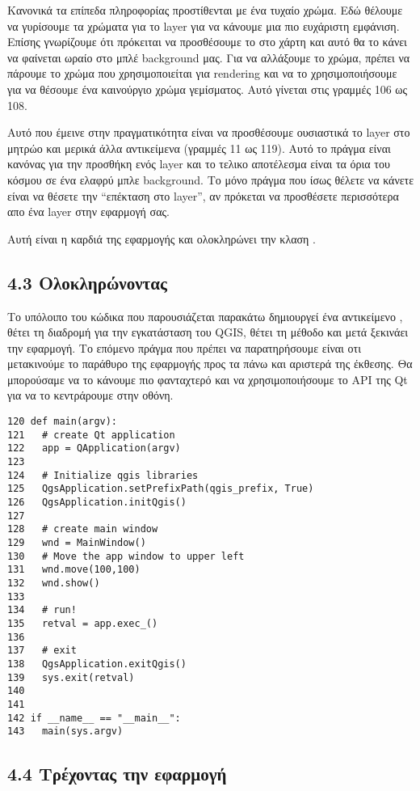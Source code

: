 Κανονικά τα επίπεδα πληροφορίας προστίθενται με ένα τυχαίο χρώμα. Εδώ θέλουμε να γυρίσουμε τα χρώματα για το layer για να κάνουμε μια πιο ευχάριστη εμφάνιση. Επίσης γνωρίζουμε ότι πρόκειται να προσθέσουμε το  στο χάρτη και αυτό θα το κάνει να φαίνεται ωραίο στο μπλέ background μας. Για να αλλάξουμε το χρώμα, πρέπει να πάρουμε το χρώμα που χρησιμοποιείται για rendering και να το χρησιμοποιήσουμε για να θέσουμε ένα καινούργιο χρώμα γεμίσματος. Αυτό γίνεται στις γραμμές  106 ως 108.  

Αυτό που έμεινε στην πραγματικότητα είναι να προσθέσουμε ουσιαστικά το layer στο μητρώο και μερικά άλλα αντικείμενα (γραμμές 11 ως 119). Αυτό το πράγμα είναι κανόνας για την προσθήκη ενός layer και το τελικο αποτέλεσμα είναι τα όρια του κόσμου σε ένα ελαφρύ μπλε background. Το μόνο πράγμα που ίσως θέλετε να κάνετε είναι να θέσετε την “επέκταση στο layer”, αν πρόκεται να προσθέσετε περισσότερα απο ένα layer στην εφαρμογή σας. 

Αυτή είναι η καρδιά της εφαρμογής και ολοκληρώνει την κλαση . 

\subsection{4.3  Ολοκληρώνοντας }

Το υπόλοιπο του κώδικα που παρουσιάζεται παρακάτω δημιουργεί ένα αντικείμενο , θέτει τη διαδρομή για την εγκατάσταση του QGIS, θέτει τη μέθοδο 
και μετά ξεκινάει την εφαρμογή. Το επόμενο πράγμα που πρέπει να παρατηρήσουμε είναι οτι μετακινούμε το παράθυρο της εφαρμογής προς τα πάνω και αριστερά της έκθεσης. Θα μπορούσαμε να το κάνουμε πιο φανταχτερό και να χρησιμοποιήσουμε το API της Qt για να το κεντράρουμε στην οθόνη.

\begin{verbatim}
120 def main(argv):
121   # create Qt application
122   app = QApplication(argv)
123 
124   # Initialize qgis libraries
125   QgsApplication.setPrefixPath(qgis_prefix, True)
126   QgsApplication.initQgis()
127 
128   # create main window
129   wnd = MainWindow()
130   # Move the app window to upper left
131   wnd.move(100,100)
132   wnd.show()
133 
134   # run!
135   retval = app.exec_()
136   
137   # exit
138   QgsApplication.exitQgis()
139   sys.exit(retval)
140 
141 
142 if __name__ == "__main__":
143   main(sys.argv)
\end{verbatim}

\subsection{4.4  Τρέχοντας την εφαρμογή }

